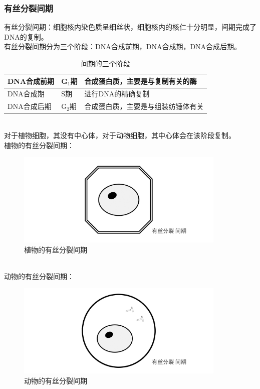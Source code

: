 \documentclass[UTF8]{ctexart}
\begin{document}
\subsubsection{有丝分裂间期}
    有丝分裂间期：细胞核内染色质呈细丝状，细胞核内的核仁十分明显，间期完成了DNA的复制。\\[3mm]
    有丝分裂间期分为三个阶段：DNA合成前期，DNA合成期，DNA合成后期。\vspace{5pt}
    \begin{table}[h]
        \begin{center}
            \begin{tabular}{l|l|l}
                \hline
                DNA合成前期\qquad\qquad&G$_1$期\qquad\qquad&合成蛋白质，主要是与复制有关的酶\qquad\qquad\\ \hline
                DNA合成期\qquad\qquad&S期\qquad\qquad&进行DNA的精确复制\qquad\qquad\\ \hline
                DNA合成后期\qquad\qquad&G$_2$期\qquad\qquad&合成蛋白质，主要是与组装纺锤体有关\qquad\qquad\\ \hline
            \end{tabular}
            \caption{间期的三个阶段}
        \end{center}
    \end{table}\\
    对于植物细胞，其没有中心体，对于动物细胞，其中心体会在该阶段复制。\\[6mm]
    植物的有丝分裂间期：
    \begin{figure}[h]
        \begin{center}
            \includegraphics[width=10cm]{BiologyImage/24.jpg}
            \caption{植物的有丝分裂间期}
        \end{center}
    \end{figure}\\
    动物的有丝分裂间期：
    \begin{figure}[h]
        \begin{center}
            \includegraphics[width=10cm]{BiologyImage/29.jpg}
            \caption{动物的有丝分裂间期}
        \end{center}
    \end{figure}\\
\end{document}
